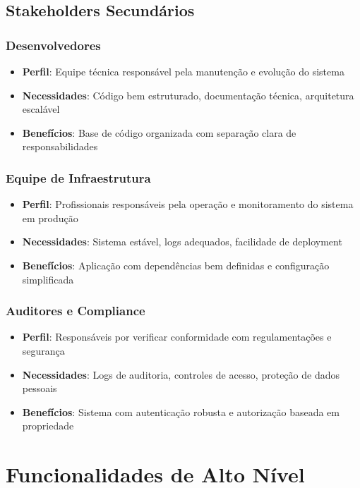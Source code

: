 \documentclass[12pt,a4paper]{article}
\begin{document}
\subsection{Stakeholders Secundários}

\subsubsection{Desenvolvedores}
\begin{itemize}
    \item \textbf{Perfil}: Equipe técnica responsável pela manutenção e evolução do sistema
    \item \textbf{Necessidades}: Código bem estruturado, documentação técnica, arquitetura escalável
    \item \textbf{Benefícios}: Base de código organizada com separação clara de responsabilidades
\end{itemize}

\subsubsection{Equipe de Infraestrutura}
\begin{itemize}
    \item \textbf{Perfil}: Profissionais responsáveis pela operação e monitoramento do sistema em produção
    \item \textbf{Necessidades}: Sistema estável, logs adequados, facilidade de deployment
    \item \textbf{Benefícios}: Aplicação com dependências bem definidas e configuração simplificada
\end{itemize}

\subsubsection{Auditores e Compliance}
\begin{itemize}
    \item \textbf{Perfil}: Responsáveis por verificar conformidade com regulamentações e segurança
    \item \textbf{Necessidades}: Logs de auditoria, controles de acesso, proteção de dados pessoais
    \item \textbf{Benefícios}: Sistema com autenticação robusta e autorização baseada em propriedade
\end{itemize}

\section{Funcionalidades de Alto Nível}
\end{document}
